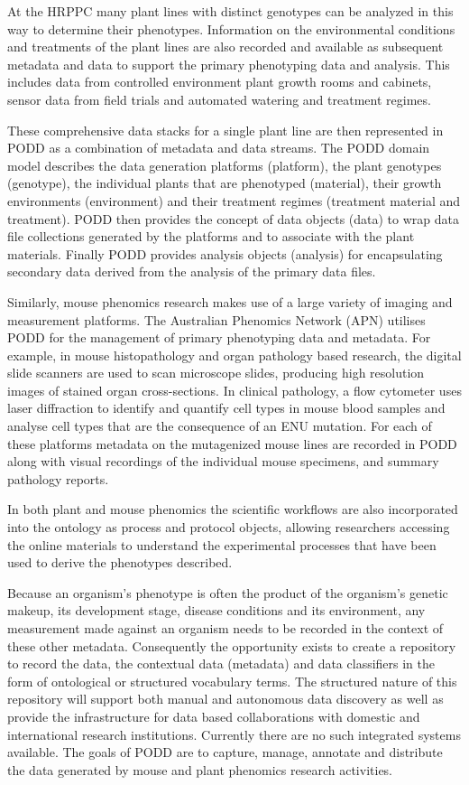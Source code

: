 \documentclass[preprint,12pt]{elsarticle}
\begin{document}
At the HRPPC many plant lines with distinct genotypes can be analyzed in this way to determine their phenotypes. Information on the environmental conditions and treatments of the plant lines are also recorded and available as subsequent metadata and data to support the primary phenotyping data and analysis. This includes data from controlled environment plant growth rooms and cabinets, sensor data from field trials and automated watering and treatment regimes. 

These comprehensive data stacks for a single plant line are then represented in PODD as a combination of metadata and data streams. The PODD domain model describes the data generation platforms (platform), the plant genotypes (genotype), the individual plants that are phenotyped (material), their growth environments (environment) and their treatment regimes (treatment material and treatment). PODD then provides the concept of data objects (data) to wrap data file collections generated by the platforms and to associate with the plant materials. Finally PODD provides analysis objects (analysis) for encapsulating secondary data derived from the analysis of the primary data files. 

Similarly, mouse phenomics research makes use of a large variety of imaging and measurement platforms. The Australian Phenomics Network (APN) utilises PODD for the management of primary phenotyping data and metadata. For example, in mouse histopathology and organ pathology based research, the digital slide scanners are used to scan microscope slides, producing high resolution images of stained organ cross-sections. In clinical pathology, a flow cytometer uses laser diffraction to identify and quantify cell types in mouse blood samples and analyse cell types that are the consequence of an ENU mutation. For each of these platforms metadata on the mutagenized mouse lines are recorded in PODD along with visual recordings of the individual mouse specimens, and summary pathology reports.

In both plant and mouse phenomics the scientific workflows are also incorporated into the ontology as process and protocol objects, allowing researchers accessing the online materials to understand the experimental processes that have been used to derive the phenotypes described.

Because an organism's phenotype is often the product of the organism's genetic makeup, its development stage, disease conditions and its environment, any measurement made against an organism needs to be recorded in the context of these other metadata. Consequently the opportunity exists to create a repository to record the data, the contextual data (metadata) and data classifiers in the form of ontological or structured vocabulary terms. The structured nature of this repository will support both manual and autonomous data discovery as well as provide the infrastructure for data based collaborations with domestic and international research institutions. Currently there are no such integrated systems available. The goals of PODD are to capture, manage, annotate and distribute the data generated by mouse and plant phenomics research activities. 
\end{document}
